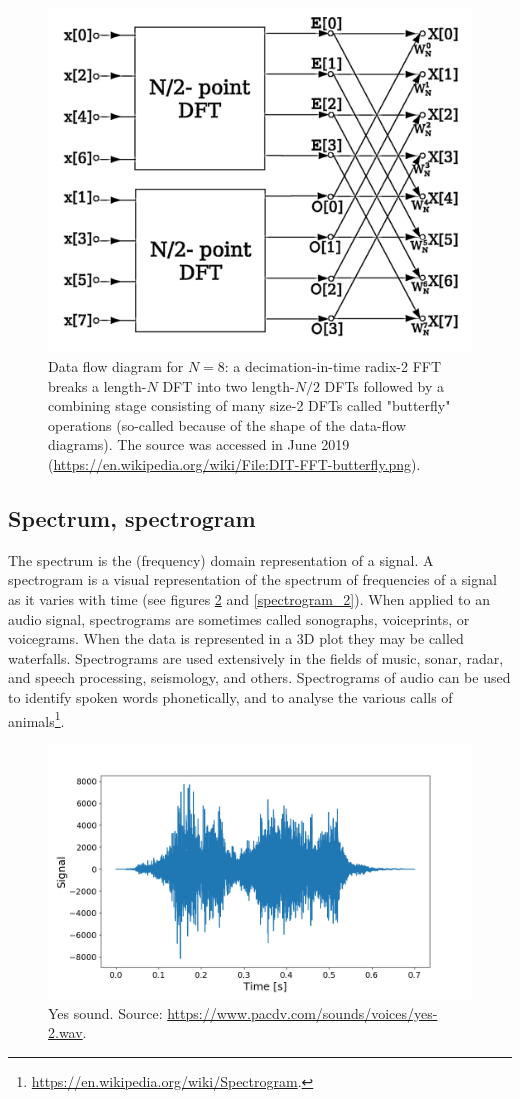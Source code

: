 \documentclass[12pt]{article}
\theoremstyle{plain}
\begin{document}
\begin{figure}[h!]
    \centering
	\includegraphics[width=.7\linewidth]{media/DIT-FFT-butterfly.png}
	\caption{Data flow diagram for $N=8$: a decimation-in-time radix-2 FFT breaks a length-$N$ DFT into two length-$N/2$ DFTs followed by a combining stage consisting of many size-2 DFTs called "butterfly" operations (so-called because of the shape of the data-flow diagrams). The source was accessed in June 2019 (\url{https://en.wikipedia.org/wiki/File:DIT-FFT-butterfly.png}).}
	\label{radix_fig}
\end{figure}

\pagebreak
\subsection{Spectrum, spectrogram}

The spectrum is the (frequency) domain representation of a signal. A spectrogram is a visual representation of the spectrum of frequencies of a signal as it varies with time (see figures \ref{spectrogram_1} and \ref{spectrogram_2}). When applied to an audio signal, spectrograms are sometimes called sonographs, voiceprints, or voicegrams. When the data is represented in a 3D plot they may be called waterfalls. Spectrograms are used extensively in the fields of music, sonar, radar, and speech processing, seismology, and others. Spectrograms of audio can be used to identify spoken words phonetically, and to analyse the various calls of animals\footnote{\url{https://en.wikipedia.org/wiki/Spectrogram}.}.

\begin{figure}[h!]
    \centering
	\includegraphics[width=.7\linewidth]{media/yes_sound_time.png}
	\caption{Yes sound. Source: \url{https://www.pacdv.com/sounds/voices/yes-2.wav}.}
	\label{spectrogram_1}
\end{figure}
\end{document}

